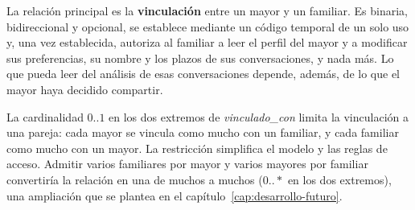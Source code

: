 La relación principal es la \textbf{vinculación} entre un mayor y un familiar. Es binaria, bidireccional y opcional, se establece mediante un código temporal de un solo uso y, una vez establecida, autoriza al familiar a leer el perfil del mayor y a modificar sus preferencias, su nombre y los plazos de sus conversaciones, y nada más. Lo que pueda leer del análisis de esas conversaciones depende, además, de lo que el mayor haya decidido compartir.

La cardinalidad $0..1$ en los dos extremos de \textit{vinculado\_con} limita la vinculación a una pareja: cada mayor se vincula como mucho con un familiar, y cada familiar como mucho con un mayor. La restricción simplifica el modelo y las reglas de acceso. Admitir varios familiares por mayor y varios mayores por familiar convertiría la relación en una de muchos a muchos ($0..*$ en los dos extremos), una ampliación que se plantea en el capítulo~\ref{cap:desarrollo-futuro}.
